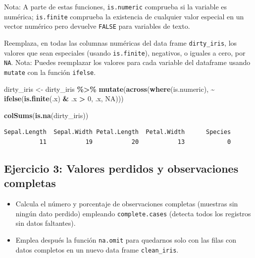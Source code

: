 \documentclass[
]{article}
\newenvironment{Shaded}{\begin{snugshade}}{\end{snugshade}}
\newcommand{\ConstantTok}[1]{\textcolor[rgb]{0.56,0.35,0.01}{#1}}
\newcommand{\DecValTok}[1]{\textcolor[rgb]{0.00,0.00,0.81}{#1}}
\newcommand{\FunctionTok}[1]{\textcolor[rgb]{0.13,0.29,0.53}{\textbf{#1}}}
\newcommand{\NormalTok}[1]{#1}
\newcommand{\OtherTok}[1]{\textcolor[rgb]{0.56,0.35,0.01}{#1}}
\newcommand{\SpecialCharTok}[1]{\textcolor[rgb]{0.81,0.36,0.00}{\textbf{#1}}}
\providecommand{\tightlist}{%
  \setlength{\itemsep}{0pt}\setlength{\parskip}{0pt}}
\begin{document}
Nota: A parte de estas funciones, \texttt{is.numeric} comprueba si la
variable es numérica; \texttt{is.finite} comprueba la existencia de
cualquier valor especial en un vector numérico pero devuelve
\texttt{FALSE} para variables de texto.

Reemplaza, en todas las columnas numéricas del data frame
\texttt{dirty\_iris}, los valores que sean especiales (usando
\texttt{is.finite}), negativos, o iguales a cero, por \texttt{NA}. Nota:
Puedes reemplazar los valores para cada variable del dataframe usando
\texttt{mutate} con la función \texttt{ifelse}.

\begin{Shaded}
\begin{Highlighting}[]
\NormalTok{dirty\_iris }\OtherTok{\textless{}{-}}\NormalTok{ dirty\_iris }\SpecialCharTok{\%\textgreater{}\%}
  \FunctionTok{mutate}\NormalTok{(}\FunctionTok{across}\NormalTok{(}\FunctionTok{where}\NormalTok{(is.numeric),}
                \SpecialCharTok{\textasciitilde{}} \FunctionTok{ifelse}\NormalTok{(}\FunctionTok{is.finite}\NormalTok{(.x) }\SpecialCharTok{\&}\NormalTok{ .x }\SpecialCharTok{\textgreater{}} \DecValTok{0}\NormalTok{, .x, }\ConstantTok{NA}\NormalTok{)))}

\FunctionTok{colSums}\NormalTok{(}\FunctionTok{is.na}\NormalTok{(dirty\_iris))}
\end{Highlighting}
\end{Shaded}

\begin{verbatim}
Sepal.Length  Sepal.Width Petal.Length  Petal.Width      Species 
          11           19           20           13            0 
\end{verbatim}

\subsection{Ejercicio 3: Valores perdidos y observaciones
completas}\label{ejercicio-3-valores-perdidos-y-observaciones-completas}

\begin{itemize}
\tightlist
\item
  Calcula el número y porcentaje de observaciones completas (muestras
  sin ningún dato perdido) empleando \texttt{complete.cases} (detecta
  todos los registros sin datos faltantes).
\item
  Emplea después la función \texttt{na.omit} para quedarnos solo con las
  filas con datos completos en un nuevo data frame \texttt{clean\_iris}.
\end{itemize}
\end{document}
